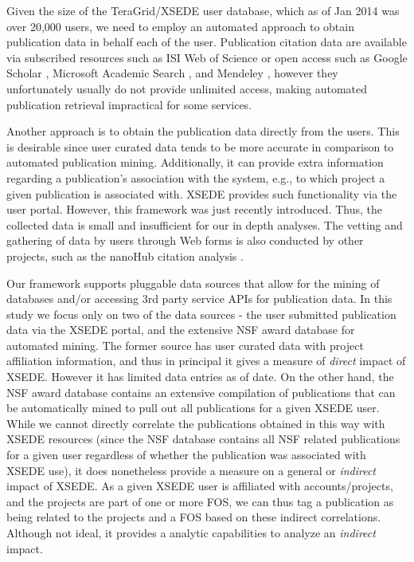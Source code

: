 \documentclass{sig-alternate}
\begin{document}
Given the size of the TeraGrid/XSEDE user database, which as of Jan
2014 was over 20,000 users, we need to employ an automated approach
to obtain publication data in behalf each of the user. Publication citation
data are available via subscribed resources such as ISI Web of Science
\cite{www-isiwos} or open access such as Google Scholar
\cite{www-googlescholar}, Microsoft Academic Search \cite{www-msas},
and Mendeley \cite{www-mendeley}, however they unfortunately usually
do not provide unlimited access, making automated publication
retrieval impractical for some services.
 
Another approach is to obtain the publication data directly from the
users. This is desirable since user curated data tends to be more
accurate in comparison to automated publication mining. Additionally,
it can provide extra information regarding a publication's association
with the system, e.g., to which project a given publication is
associated with. XSEDE provides such functionality via the user
portal. However, this framework was just recently introduced. Thus,
the collected data is small and insufficient for our in depth
analyses. The vetting and gathering of data by users through Web forms
is also conducted by other projects, such as the nanoHub citation
analysis \cite{www-nanohubcite}.
 
Our framework supports pluggable data sources that allow for the
mining of databases and/or accessing 3rd party service APIs for
publication data. In this study we focus only on two of the data
sources - the user submitted publication data via the XSEDE portal,
and the extensive NSF award database for automated mining. The former
source has user curated data with project affiliation information, and
thus in principal it gives a measure of \emph{direct} impact of
XSEDE. However it has limited data entries as of date. On the other
hand, the NSF award database contains an extensive compilation of
publications that can be automatically mined to pull out all
publications for a given XSEDE user. While we cannot directly
correlate the publications obtained in this way with XSEDE resources
(since the NSF database contains all NSF related publications for a
given user regardless of whether the publication was associated with
XSEDE use), it does nonetheless provide a measure on a general or
\emph{indirect} impact of XSEDE. As a given XSEDE user is affiliated
with accounts/projects, and the projects are part of one or more FOS,
we can thus tag a publication as being related to the projects and a
FOS based on these indirect correlations. Although not ideal, it
provides a analytic capabilities to analyze an \emph{indirect} impact.
 
\end{document}
